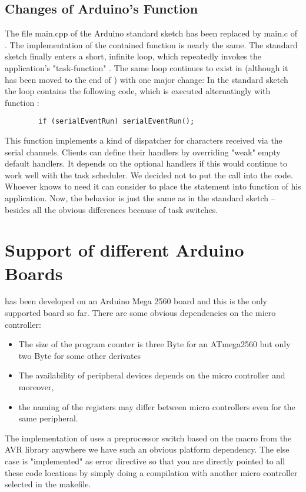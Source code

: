 

\subsection{Changes of Arduino's  Function}

The file main.cpp of the Arduino standard sketch has been replaced by
main.c of \rtos. The implementation of the contained function 
is nearly the same. The standard sketch finally enters a short, infinite
loop, which repeatedly invokes the application's "task-function"
. The same loop continues to exist in \rtos{} (although it has
been moved to the end of ) with one major change: In
the standard sketch the loop contains the following code, which is
executed alternatingly with function :
\begin{verbatim}
		if (serialEventRun) serialEventRun();
\end{verbatim}
This function implements a kind of dispatcher for characters received via
the serial channels. Clients can define their handlers by overriding
"weak" empty default handlers. It depends on the optional handlers if this
would continue to work well with the \rtos{} task scheduler. We decided
not to put the call into the \rtos{} code. Whoever knows to need it can
consider to place the statement into function  of his \rtos{}
application. Now, the behavior is just the same as in the standard sketch
-- besides all the obvious differences because of task switches.


\section{Support of different Arduino Boards}
\label{secArduinoBoards}

\rtos{} has been developed on an Arduino Mega 2560 board and this is the
only supported board so far. There are some obvious dependencies on the
micro controller:
\begin{itemize}
  \item The size of the program counter is three Byte for an ATmega2560
    but only two Byte for some other derivates
  \item The availability of peripheral devices depends on the micro controller and
    moreover,
  \item the naming of the registers may differ between micro controllers even for the
    same peripheral.
\end{itemize}
The implementation of \rtos{} uses a preprocessor switch based on the
macro  from the AVR library anywhere we have
such an obvious platform dependency. The else case is "implemented" as
error directive so that you are directly pointed to all these code locations
by simply doing a compilation with another micro controller selected in the makefile.

